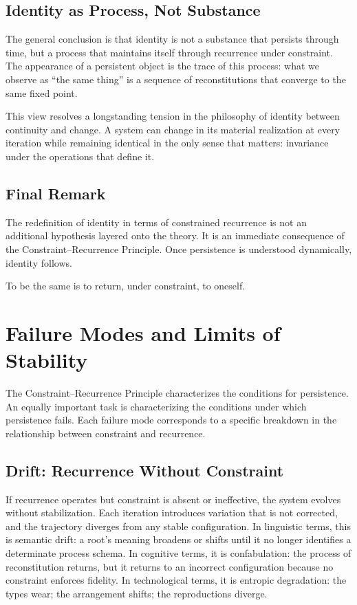 \documentclass[12pt, oneside]{article}
\theoremstyle{definition}
\theoremstyle{remark}
\begin{document}
\subsection{Identity as Process, Not Substance}

The general conclusion is that identity is not a substance that persists through time, but a process that maintains itself through recurrence under constraint.
The appearance of a persistent object is the trace of this process: what we observe as ``the same thing'' is a sequence of reconstitutions that converge to the same fixed point.

This view resolves a longstanding tension in the philosophy of identity between continuity and change.
A system can change in its material realization at every iteration while remaining identical in the only sense that matters: invariance under the operations that define it.

\subsection{Final Remark}

The redefinition of identity in terms of constrained recurrence is not an additional hypothesis layered onto the theory.
It is an immediate consequence of the Constraint--Recurrence Principle.
Once persistence is understood dynamically, identity follows.

\begin{quoting}
To be the same is to return, under constraint, to oneself.
\end{quoting}

\section{Failure Modes and Limits of Stability}

The Constraint--Recurrence Principle characterizes the conditions for persistence.
An equally important task is characterizing the conditions under which persistence fails.
Each failure mode corresponds to a specific breakdown in the relationship between constraint and recurrence.

\subsection{Drift: Recurrence Without Constraint}

If recurrence operates but constraint is absent or ineffective, the system evolves without stabilization.
Each iteration introduces variation that is not corrected, and the trajectory diverges from any stable configuration.
In linguistic terms, this is semantic drift: a root's meaning broadens or shifts until it no longer identifies a determinate process schema.
In cognitive terms, it is confabulation: the process of reconstitution returns, but it returns to an incorrect configuration because no constraint enforces fidelity.
In technological terms, it is entropic degradation: the types wear; the arrangement shifts; the reproductions diverge.
\end{document}
